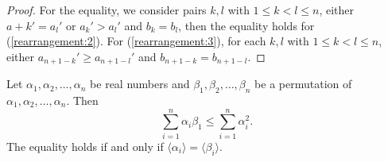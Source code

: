 \begin{proof}
  For the equality, we consider pairs $k, l$ with $1\leq k < l\leq n$, either $a+k' = a_l'$ or $a_k'>a_l'$ and $b_k = b_l$, then
  the equality holds for (\ref{rearrangement:2}). For (\ref{rearrangement:3}), for each $k, l$ with $1\leq k < l \leq n$, either
  $a_{n + 1 - k}' \geq a_{n + 1 - l}'$ and $b_{n + 1 - k} = b_{n  + 1 - l}$.
\end{proof}

\begin{corollary}
  Let $\alpha_1, \alpha_2, \ldots, \alpha_n$ be real numbers and $\beta_1, \beta_2, \ldots, \beta_n$ be a permutation of $\alpha_1,
  \alpha_2, \ldots, \alpha_n$. Then $$\sum_{i=1}^n\alpha_i\beta_1\leq \sum_{i=1}^n\alpha_i^2.$$ The equality holds if and only if
  $\langle\alpha_i\rangle = \langle\beta_i\rangle$.
\end{corollary}

